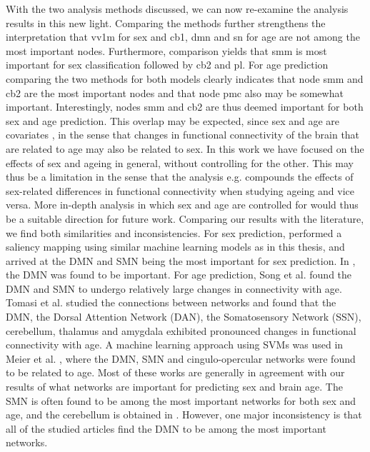 With the two analysis methods discussed, we can now re-examine the analysis results in this new light. Comparing the methods further strengthens the interpretation that \acrshort{vv1m} for sex and \acrshort{cb1}, \acrshort{dmn} and \acrshort{sn} for age are not among the most important nodes. Furthermore, comparison yields that \acrshort{smm} is most important for sex classification followed by \acrshort{cb2} and \acrshort{pl}. For age prediction comparing the two methods for both models clearly indicates that node \acrshort{smm} and \acrshort{cb2} are the most important nodes and that node \acrshort{pmc} also may be somewhat important. Interestingly, nodes \acrshort{smm} and \acrshort{cb2} are thus deemed important for both sex and age prediction. This overlap may be expected, since sex and age are covariates \cite{zhang_covariates}, in the sense that changes in functional connectivity of the brain that are related to age may also be related to sex. In this work we have focused on the effects of sex and ageing in general, without controlling for the other. This may thus be a limitation in the sense that the analysis e.g. compounds the effects of sex-related differences in functional connectivity when studying ageing and vice versa. More in-depth analysis in which sex and age are controlled for would thus be a suitable direction for future work.
Comparing our results with the literature, we find both similarities and inconsistencies. For sex prediction, \cite{understanding_gnn} performed a saliency mapping using similar machine learning models as in this thesis, and arrived at the DMN and SMN being the most important for sex prediction. In \cite{arslan}, the DMN was found to be important. For age prediction, Song et al. \cite{song_reorganizational} found the DMN and SMN to undergo relatively large changes in connectivity with age. Tomasi et al. \cite{tomasi_aging} studied the connections between networks and found that the DMN, the Dorsal Attention Network (DAN), the Somatosensory Network (SSN), cerebellum, thalamus and amygdala exhibited pronounced changes in functional connectivity with age. A machine learning approach using SVMs was used in Meier et al. \cite{meier_svm}, where the DMN, SMN and cingulo-opercular networks were found to be related to age. Most of these works are generally in agreement with our results of what networks are important for predicting sex and brain age. The SMN is often found to be among the most important networks for both sex and age, and the cerebellum is obtained in \cite{tomasi_aging}. However, one major inconsistency is that all of the studied articles find the DMN to be among the most important networks. 

